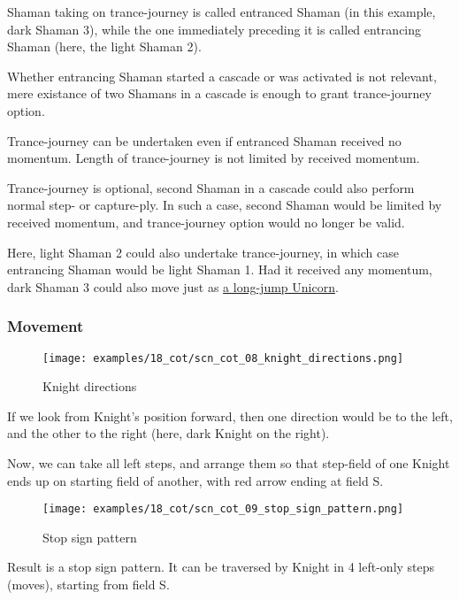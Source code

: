 Shaman taking on trance-journey is called entranced Shaman (in this example,
dark Shaman 3), while the one immediately preceding it is called entrancing
Shaman (here, the light Shaman 2).

Whether entrancing Shaman started a cascade or was activated is not relevant,
mere existance of two Shamans in a cascade is enough to grant trance-journey
option.

Trance-journey can be undertaken even if entranced Shaman received no momentum.
Length of trance-journey is not limited by received momentum.

Trance-journey is optional, second Shaman in a cascade could also perform normal
step- or capture-ply. In such a case, second Shaman would be limited by received
momentum, and trance-journey option would no longer be valid.

Here, light Shaman 2 could also undertake trance-journey, in which case entrancing
Shaman would be light Shaman 1.
Had it received any momentum, dark Shaman 3 could also move just as
\hyperref[fig:scn_cot_04_dark_shaman_step_ply]{a long-jump Unicorn}.

\clearpage %

\subsubsection*{Movement}

\noindent
\begin{wrapfigure}[10]{l}{0.4\textwidth}
\centering
\texttt{[image: examples/18\_cot/scn\_cot\_08\_knight\_directions.png]}
\caption{Knight directions}
\label{fig:scn_cot_08_knight_directions}
\end{wrapfigure}
If we look from Knight's position forward, then one direction would be to
the left, and the other to the right (here, dark Knight on the right).

Now, we can take all left steps, and arrange them so that step-field of one
Knight ends up on starting field of another, with red arrow ending at field S.


\vspace*{0.10\textheight}
\noindent
\begin{wrapfigure}[12]{l}{0.4\textwidth}
\centering
\texttt{[image: examples/18\_cot/scn\_cot\_09\_stop\_sign\_pattern.png]}
\caption{Stop sign pattern}
\label{fig:scn_cot_09_stop_sign_pattern}
\end{wrapfigure}
Result is a stop sign pattern. It can be traversed by Knight in 4 left-only
steps (moves), starting from field S.


